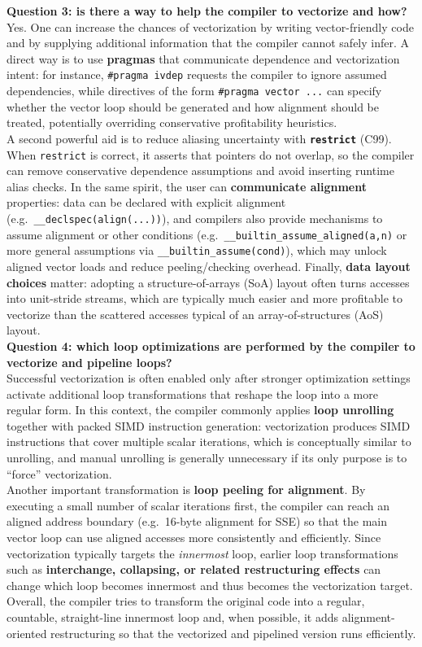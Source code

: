 \documentclass[unicode,10pt,a4paper,oneside,numbers=endperiod,openany]{scrartcl}
\begin{document}
\textbf{Question 3: is there a way to help the compiler to vectorize and how?}\\
Yes. One can increase the chances of vectorization by writing vector-friendly code and by supplying additional information that the compiler cannot safely infer. A direct way is to use \textbf{pragmas} that communicate dependence and vectorization intent: for instance, \texttt{\#pragma ivdep} requests the compiler to ignore assumed dependencies, while directives of the form \texttt{\#pragma vector ...} can specify whether the vector loop should be generated and how alignment should be treated, potentially overriding conservative profitability heuristics.\\
A second powerful aid is to reduce aliasing uncertainty with \textbf{\texttt{restrict}} (C99). When \texttt{restrict} is correct, it asserts that pointers do not overlap, so the compiler can remove conservative dependence assumptions and avoid inserting runtime alias checks. In the same spirit, the user can \textbf{communicate alignment} properties: data can be declared with explicit alignment (e.g.\ \texttt{\_\_declspec(align(...))}), and compilers also provide mechanisms to assume alignment or other conditions (e.g.\ \texttt{\_\_builtin\_assume\_aligned(a,n)} or more general assumptions via \texttt{\_\_builtin\_assume(cond)}), which may unlock aligned vector loads and reduce peeling/checking overhead. Finally, \textbf{data layout choices} matter: adopting a structure-of-arrays (SoA) layout often turns accesses into unit-stride streams, which are typically much easier and more profitable to vectorize than the scattered accesses typical of an array-of-structures (AoS) layout.\\

\textbf{Question 4: which loop optimizations are performed by the compiler to vectorize and pipeline loops?}\\
Successful vectorization is often enabled only after stronger optimization settings activate additional loop transformations that reshape the loop into a more regular form. In this context, the compiler commonly applies \textbf{loop unrolling} together with packed SIMD instruction generation: vectorization produces SIMD instructions that cover multiple scalar iterations, which is conceptually similar to unrolling, and manual unrolling is generally unnecessary if its only purpose is to ``force'' vectorization.\\
Another important transformation is \textbf{loop peeling for alignment}. By executing a small number of scalar iterations first, the compiler can reach an aligned address boundary (e.g.\ 16-byte alignment for SSE) so that the main vector loop can use aligned accesses more consistently and efficiently. Since vectorization typically targets the \emph{innermost} loop, earlier loop transformations such as \textbf{interchange, collapsing, or related restructuring effects} can change which loop becomes innermost and thus becomes the vectorization target. Overall, the compiler tries to transform the original code into a regular, countable, straight-line innermost loop and, when possible, it adds alignment-oriented restructuring so that the vectorized and pipelined version runs efficiently.\\
\end{document}
